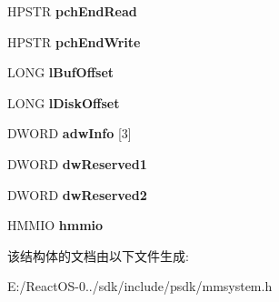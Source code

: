 \begin{DoxyCompactItemize}
H\+P\+S\+TR {\bfseries pch\+End\+Read}
\item 
\mbox{\label{struct___m_m_i_o_i_n_f_o_a706daced4b43a4977f612125a334e0cc}} 
H\+P\+S\+TR {\bfseries pch\+End\+Write}
\item 
\mbox{\label{struct___m_m_i_o_i_n_f_o_a7566c394d5c039fe8bbf8bb7caa150c3}} 
L\+O\+NG {\bfseries l\+Buf\+Offset}
\item 
\mbox{\label{struct___m_m_i_o_i_n_f_o_a77685f5942c577d1c1ce3ab16a004a89}} 
L\+O\+NG {\bfseries l\+Disk\+Offset}
\item 
\mbox{\label{struct___m_m_i_o_i_n_f_o_ab229560dfc109aed230845f39596e5ee}} 
D\+W\+O\+RD {\bfseries adw\+Info} \mbox{[}3\mbox{]}
\item 
\mbox{\label{struct___m_m_i_o_i_n_f_o_a356faa98f0624f1ee29ec5a0ec55f4bb}} 
D\+W\+O\+RD {\bfseries dw\+Reserved1}
\item 
\mbox{\label{struct___m_m_i_o_i_n_f_o_aa4940df9e0c65ad84c6cc19f02858d62}} 
D\+W\+O\+RD {\bfseries dw\+Reserved2}
\item 
\mbox{\label{struct___m_m_i_o_i_n_f_o_aea094af72b7a8db3b3e7e1e3fe0d89cd}} 
H\+M\+M\+IO {\bfseries hmmio}
\end{DoxyCompactItemize}


该结构体的文档由以下文件生成\+:\begin{DoxyCompactItemize}
\item 
E\+:/\+React\+O\+S-\/0../sdk/include/psdk/mmsystem.\+h\end{DoxyCompactItemize}
